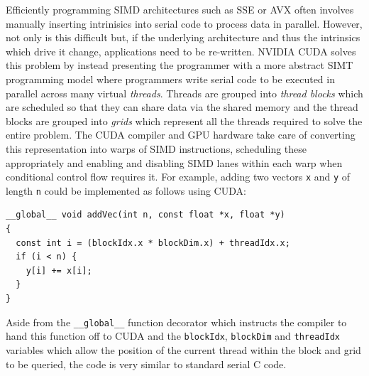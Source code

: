 \documentclass[utf8]{frontiersSCNS} %
\begin{document}
Efficiently programming SIMD architectures such as SSE or AVX often involves manually inserting intrinisics into serial code to process data in parallel.
However, not only is this difficult but, if the underlying architecture and thus the intrinsics which drive it change, applications need to be re-written.
NVIDIA CUDA solves this problem by instead presenting the programmer with a more abstract SIMT programming model where programmers write serial code to be executed in parallel across many virtual \textit{threads}.
Threads are grouped into \textit{thread blocks} which are scheduled so that they can share data via the shared memory and the thread blocks are grouped into \textit{grids} which represent all the threads required to solve the entire problem.
The CUDA compiler and GPU hardware take care of converting this representation into warps of SIMD instructions, scheduling these appropriately and enabling and disabling SIMD lanes within each warp when conditional control flow requires it.
For example, adding two vectors \lstinline{x} and \lstinline{y} of length \lstinline{n} could be implemented as follows using CUDA:
\begin{lstlisting}
__global__ void addVec(int n, const float *x, float *y)
{
  const int i = (blockIdx.x * blockDim.x) + threadIdx.x;
  if (i < n) {
    y[i] += x[i];
  }
}
\end{lstlisting}
Aside from the \lstinline{__global__} function decorator which instructs the compiler to hand this function off to CUDA and the \lstinline{blockIdx}, \lstinline{blockDim} and \lstinline{threadIdx} variables which allow the position of the current thread within the block and grid to be queried, the code is very similar to standard serial C code.
\end{document}
